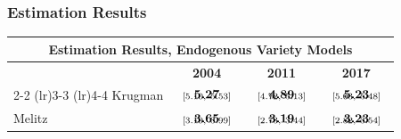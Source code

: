 \documentclass[10pt,pdftex,aspectratio=1610]{beamer}
\theoremstyle{definition}
\begin{document}
\begin{frame}[t]
\frametitle{Estimation Results}
\footnotesize

\begin{table}[!t]
\footnotesize
\renewcommand{\arraystretch}{1.85}
\setlength {\tabcolsep}{3.0mm}
\begin{center}\label{tb:data_rslts}
\begin{tabular}[t]{l c c c }
\multicolumn{4}{c}{\normalsize \textbf{ Estimation Results, Endogenous Variety Models}}
\\
\hline
\hline
& \textbf{2004} & \textbf{2011} & \textbf{2017} \\
\cmidrule(r){2-2}  \cmidrule(lr){3-3} \cmidrule(lr){4-4}
Krugman       & $\begin{array}{c}{\textbf{5.27}} \vspace{-.4cm}\\ \scriptstyle{[5.10,   \ 5.53]}\end{array}$ &
$\begin{array}{c}{\textbf{4.89}} \vspace{-.4cm}\\ \scriptstyle{[4.72,   \ 5.13]}\end{array}$ &
$\begin{array}{c}{\textbf{5.23}} \vspace{-.4cm}\\ \scriptstyle{[5.03,   \ 5.48]}\end{array}$ \\
Melitz             & $\begin{array}{c}{\textbf{3.65}} \vspace{-.4cm}\\ \scriptstyle{[3.19,   \ 3.99]}\end{array}$  &
$\begin{array}{c}{\textbf{3.19}} \vspace{-.4cm}\\ \scriptstyle{[2.73,   \ 3.44]}\end{array}$ &
$\begin{array}{c}{\textbf{3.23}} \vspace{-.4cm}\\ \scriptstyle{[2.82,   \ 3.54]}\end{array}$\\
\hline
\end{tabular}
\\[0.75ex]
\parbox{2.5in}{\footnotesize }
\end{center}
\end{table}


\end{frame}
\end{document}
